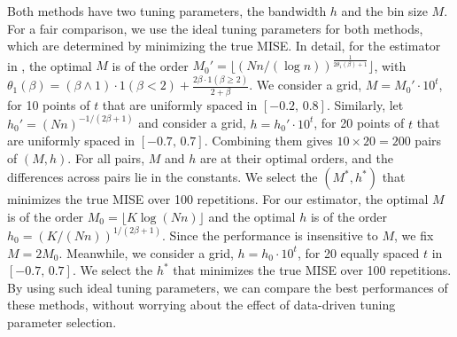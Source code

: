 \documentclass[preprint,11pt]{article}
\numberwithin{equation}{section}
\begin{document}
Both methods have two tuning parameters, the bandwidth $h$ and the bin size $M$. 
For a fair comparison, we use the ideal tuning parameters for both methods, which are determined by minimizing the true MISE. In detail, for the estimator in \cite{austern2025poisson}, 
the optimal $M$ is of the order $M_0' = \lfloor (Nn/(\log n))^{\frac{1}{2\theta_1(\beta)+1}}\rfloor$, with $\theta_1(\beta)=(\beta\wedge 1)\cdot1(\beta<2)+\frac{2\beta \cdot 1(\beta\ge 2)}{2+\beta}$.  
We consider a grid,  $M = M_0' \cdot 10^{t}$, for 10 points of $t$ that are uniformly spaced in $[-0.2,\,0.8]$. 
Similarly, let $h_0' = (Nn)^{-1/(2\beta+1)}$ and consider a grid, $h = h_0' \cdot 10^{t}$, for 20 points of $t$ that are uniformly spaced in $[-0.7,\,0.7]$. Combining them gives $10\times 20=200$ pairs of $(M, h)$. For all pairs, $M$ and $h$ are at their optimal orders, and the differences across pairs lie in the constants. 
We select the $(M^*, h^*)$ that minimizes the true MISE over 100 repetitions. 
For our estimator, the optimal $M$ is of the order $M_0=\lfloor K\log(Nn)\rfloor$ and the optimal $h$ is of the order $h_0= (K/(Nn))^{1/(2\beta+1)}$. Since the performance is insensitive to $M$, we fix $M=2M_0$. Meanwhile, we consider a grid, $h=h_0 \cdot 10^{t}$, for 20 equally spaced $t$ in $[-0.7, \, 0.7]$. We select the $h^{*}$ that minimizes the true MISE over 100 repetitions.  
By using such ideal tuning parameters, we can compare the best performances of these methods, without worrying about the effect of data-driven tuning parameter selection. 
\end{document}
